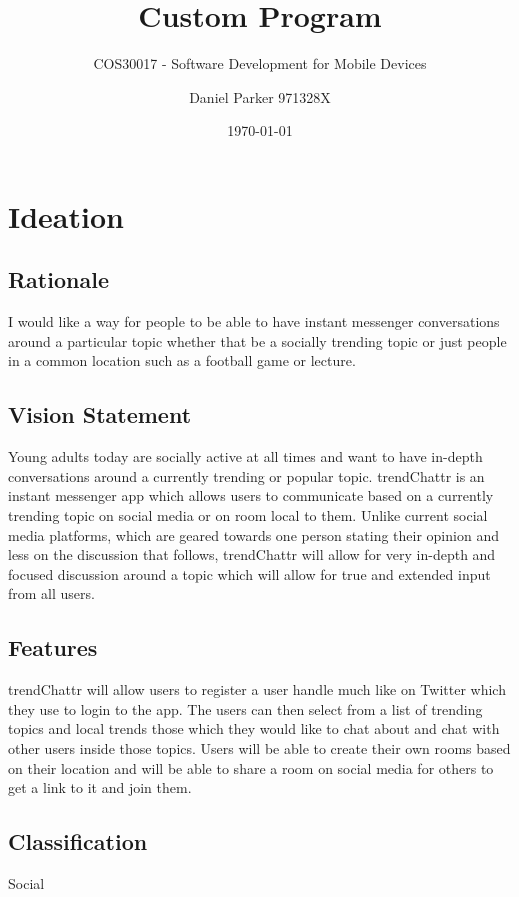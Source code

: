 \documentclass[11pt,english,numbers=endperiod,parskip=half]{scrartcl}
\title{Custom Program}
\subtitle{COS30017 - Software Development for Mobile Devices}
\author{Daniel Parker 971328X}
\date{\today}
\begin{document}
\maketitle
\thispagestyle{empty}

\section{Ideation}
  \subsection{Rationale}
    I would like a way for people to be able to have instant messenger
    conversations around a particular topic whether that be a socially trending
    topic or just people in a common location such as a football game or lecture.

  \subsection{Vision Statement}
    Young adults today are socially active at all times and want to have
    in-depth conversations around a currently trending or popular topic.
    trendChattr is an instant messenger app which allows users to communicate
    based on a currently trending topic on social media or on room local to them.
    Unlike current social media platforms, which are geared towards one person
    stating their opinion and less on the discussion that follows, trendChattr
    will allow for very in-depth and focused discussion around a topic which will
    allow for true and extended input from all users.

  \subsection{Features}
    trendChattr will allow users to register a user handle much like on Twitter
    which they use to login to the app. The users can then select from a list of
    trending topics and local trends those which they would like to chat about
    and chat with other users inside those topics. Users will be able to create
    their own rooms based on their location and will be able to share
    a room on social media for others to get a link to it and join them.

  \subsection{Classification}
    Social
\end{document}
